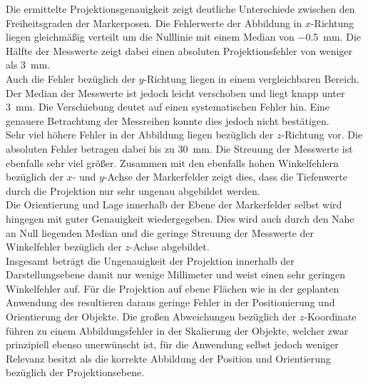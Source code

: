 

Die ermittelte Projektionsgenauigkeit zeigt deutliche Unterschiede zwischen den Freiheitsgraden der Markerposen. Die Fehlerwerte der Abbildung in $x$-Richtung liegen gleichmäßig verteilt um die Nulllinie mit einem Median von \SI{-0.5}{\milli\meter}. Die Hälfte der Messwerte zeigt dabei einen absoluten Projektionsfehler von weniger als \SI{3}{\milli\meter}.\\
Auch die Fehler bezüglich der $y$-Richtung liegen in einem vergleichbaren Bereich. Der Median der Messwerte ist jedoch leicht verschoben und liegt knapp unter \SI{3}{\milli\meter}. Die Verschiebung deutet auf einen systematischen Fehler hin. Eine genauere Betrachtung der Messreihen konnte dies jedoch nicht bestätigen.\\

Sehr viel höhere Fehler in der Abbildung liegen bezüglich der $z$-Richtung vor. Die absoluten Fehler betragen dabei bis zu \SI{30}{\milli\meter}. Die Streuung der Messwerte ist ebenfalls sehr viel größer. Zusammen mit den ebenfalls hohen Winkelfehlern bezüglich der $x$- und $y$-Achse der Markerfelder zeigt dies, dass die Tiefenwerte durch die Projektion nur sehr ungenau abgebildet werden.\\
Die Orientierung und Lage innerhalb der Ebene der Markerfelder selbst wird hingegen mit guter Genauigkeit wiedergegeben. Dies wird auch durch den Nahe an Null liegenden Median und die geringe Streuung der Messwerte der Winkelfehler bezüglich der $z$-Achse abgebildet.\\

Insgesamt beträgt die Ungenauigkeit der Projektion innerhalb der Darstellungsebene damit nur wenige Millimeter und weist einen sehr geringen Winkelfehler auf. Für die Projektion auf ebene Flächen wie in der geplanten Anwendung des  resultieren daraus geringe Fehler in der Positionierung und Orientierung der Objekte. Die großen Abweichungen bezüglich der $z$-Koordinate führen zu einem Abbildungsfehler in der Skalierung der Objekte, welcher zwar prinzipiell ebenso unerwünscht ist, für die Anwendung selbst jedoch weniger Relevanz besitzt als die korrekte Abbildung der Position und Orientierung bezüglich der Projektionsebene.\\

\red[Legende!?\\]


